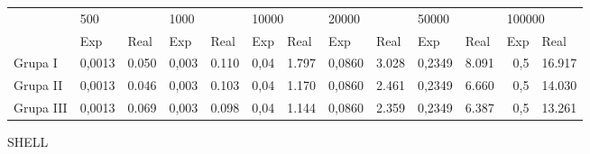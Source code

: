 \documentclass{article}
\begin{document}
\begin{table}[H]
    \begin{tabular}{lrlrlrlrlrlrl}
                       & \multicolumn{2}{l}{500}         & \multicolumn{2}{l}{1000}        & \multicolumn{2}{l}{10000}            & \multicolumn{2}{l}{20000}       & \multicolumn{2}{l}{50000}       & \multicolumn{2}{l}{100000}       \\
    \multirow{-2}{*}{} & \multicolumn{1}{l}{Exp} & Real  & \multicolumn{1}{l}{Exp} & Real  & \multicolumn{1}{l}{Exp}      & Real  & \multicolumn{1}{l}{Exp} & Real  & \multicolumn{1}{l}{Exp} & Real  & \multicolumn{1}{l}{Exp} & Real   \\
    Grupa I            & 0,0013                  & 0.050 & 0,003                   & 0.110 & 0,04 & 1.797 & 0,0860                  & 3.028 & 0,2349                  & 8.091 & 0,5                     & 16.917 \\
    Grupa II           & 0,0013                  & 0.046 & 0,003                   & 0.103 & 0,04 & 1.170 & 0,0860                  & 2.461 & 0,2349                  & 6.660 & 0,5                     & 14.030 \\
    Grupa III          & 0,0013                  & 0.069 & 0,003                   & 0.098 & 0,04 & 1.144 & 0,0860                  & 2.359 & 0,2349                  & 6.387 & 0,5                     & 13.261
    \end{tabular}
    \end{table}

SHELL
\end{document}
